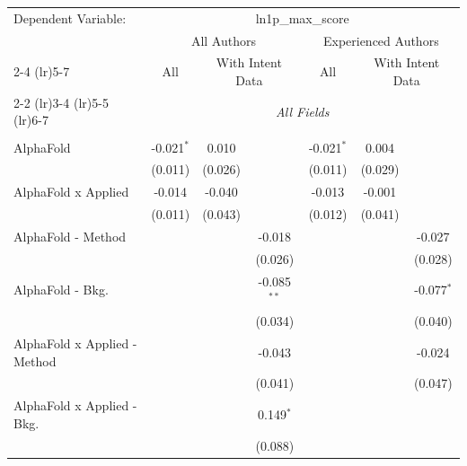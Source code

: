 \begingroup
\centering
\begin{tabular}{lcccccc}
   \tabularnewline \midrule \midrule
   Dependent Variable: & \multicolumn{6}{c}{ln1p\_max\_score}\\
 & \multicolumn{3}{c}{All Authors} & \multicolumn{3}{c}{Experienced Authors} \\
\cmidrule(lr){2-4} \cmidrule(lr){5-7}
 & \multicolumn{1}{c}{All} & \multicolumn{2}{c}{With Intent Data} & \multicolumn{1}{c}{All} & \multicolumn{2}{c}{With Intent Data} \\
\cmidrule(lr){2-2} \cmidrule(lr){3-4} \cmidrule(lr){5-5} \cmidrule(lr){6-7}
 & \multicolumn{6}{c}{\textit{All Fields}} \\ \\
   AlphaFold                      & -0.021$^{*}$ & 0.010        &               & -0.021$^{*}$ & 0.004   &   \\   
                                  & (0.011)      & (0.026)      &               & (0.011)      & (0.029) &   \\   
   AlphaFold x Applied            & -0.014       & -0.040       &               & -0.013       & -0.001  &   \\   
                                  & (0.011)      & (0.043)      &               & (0.012)      & (0.041) &   \\   
   AlphaFold - Method             &              &              & -0.018        &              &         & -0.027\\   
                                  &              &              & (0.026)       &              &         & (0.028)\\   
   AlphaFold - Bkg.               &              &              & -0.085$^{**}$ &              &         & -0.077$^{*}$\\   
                                  &              &              & (0.034)       &              &         & (0.040)\\   
   AlphaFold x Applied - Method   &              &              & -0.043        &              &         & -0.024\\   
                                  &              &              & (0.041)       &              &         & (0.047)\\   
   AlphaFold x Applied - Bkg.     &              &              & 0.149$^{*}$   &              &         &   \\   
                                  &              &              & (0.088)       &              &         &   \\   

\end{tabular}
